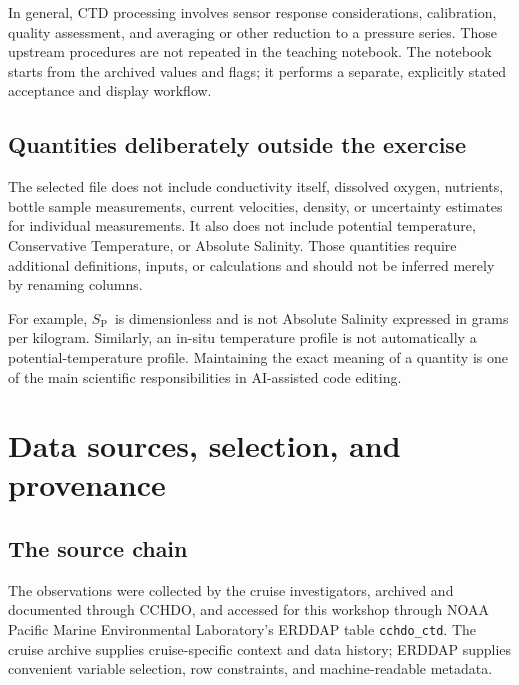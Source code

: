 \documentclass[11pt,letterpaper]{article}
\newcommand{\field}[1]{\nolinkurl{#1}}
\newcommand{\SP}{\ensuremath{S_{\mathrm{P}}}}
\begin{document}
In general, CTD processing involves sensor response considerations, calibration, quality assessment, and averaging or other reduction to a pressure series.\cite{ctdmanual} Those upstream procedures are not repeated in the teaching notebook. The notebook starts from the archived values and flags; it performs a separate, explicitly stated acceptance and display workflow.

\subsection{Quantities deliberately outside the exercise}
The selected file does not include conductivity itself, dissolved oxygen, nutrients, bottle sample measurements, current velocities, density, or uncertainty estimates for individual measurements. It also does not include potential temperature, Conservative Temperature, or Absolute Salinity. Those quantities require additional definitions, inputs, or calculations and should not be inferred merely by renaming columns.

For example, \SP\ is dimensionless and is not Absolute Salinity expressed in grams per kilogram.\cite{gswsalinity} Similarly, an in-situ temperature profile is not automatically a potential-temperature profile. Maintaining the exact meaning of a quantity is one of the main scientific responsibilities in AI-assisted code editing.

\section{Data sources, selection, and provenance}

\subsection{The source chain}
The observations were collected by the cruise investigators, archived and documented through CCHDO, and accessed for this workshop through NOAA Pacific Marine Environmental Laboratory's ERDDAP table \field{cchdo_ctd}. The cruise archive supplies cruise-specific context and data history; ERDDAP supplies convenient variable selection, row constraints, and machine-readable metadata.\cite{cruise,erddap}
\end{document}

